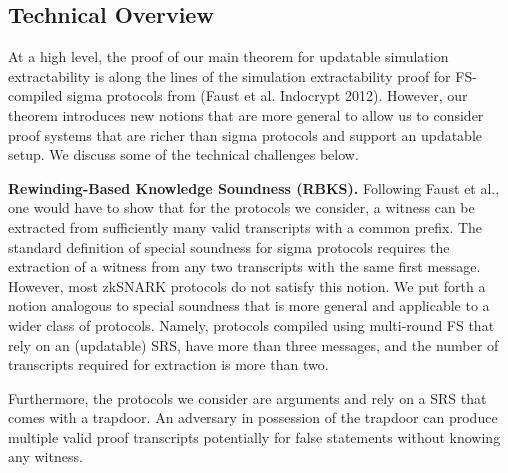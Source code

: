 \documentclass[11pt]{llncs}
\newcommand{\oursubsub}[1] {\smallskip\noindent\textbf{#1}}
\begin{document}

\subsection{Technical Overview}
At a high level, the proof of our main theorem for updatable simulation
extractability is along the lines of the simulation extractability proof for
FS-compiled sigma protocols from (Faust et al. Indocrypt 2012). However, our theorem
introduces new notions that are more general to allow us to consider proof
systems that are richer than sigma protocols and support an updatable setup. We
discuss some of the technical challenges below.

\oursubsub{Rewinding-Based Knowledge Soundness (RBKS).}
Following Faust et al., one would have to show that for the protocols
we consider, a witness can be extracted from sufficiently many valid transcripts
with a common prefix. The standard definition of special soundness for sigma
protocols requires the extraction of a witness from any two transcripts with the
same first message. However, most zkSNARK protocols do not satisfy this notion.
We put forth a notion analogous to special soundness that is more general and
applicable to a wider class of protocols. Namely, protocols compiled using multi-round FS that rely on an (updatable) SRS,  have more than three messages, and the number of transcripts required for extraction is more than two. 

Furthermore, the protocols we consider are arguments and rely on a SRS that comes with a trapdoor. An adversary in possession of the trapdoor can produce multiple valid proof transcripts potentially for false statements without
knowing any witness. 
\end{document}

